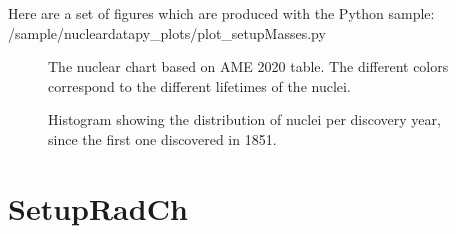 \documentclass[letterpaper,10pt,english]{sphinxmanual}
\begin{document}
\sphinxAtStartPar
Here are a set of figures which are produced with the Python sample: /sample/nucleardatapy\_plots/plot\_setupMasses.py

\begin{figure}[htbp]
\centering
\capstart

\noindent{}
\caption{The nuclear chart based on AME 2020 table. The different colors correspond to the different life\sphinxhyphen{}times of the nuclei.}\label{\detokenize{source/api/setup_masses:id1}}\end{figure}

\begin{figure}[htbp]
\centering
\capstart

\noindent{}
\caption{Histogram showing the distribution of nuclei per discovery year, since the first one discovered in 1851.}\label{\detokenize{source/api/setup_masses:id2}}\end{figure}

\sphinxstepscope


\section{SetupRadCh}
\label{\detokenize{source/api/setup_rad_ch:setupradch}}\label{\detokenize{source/api/setup_rad_ch::doc}}\label{\detokenize{source/api/setup_rad_ch:module-nucleardatapy.setup_rad_ch}}
\end{document}
